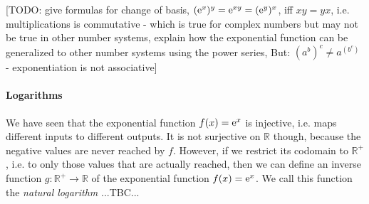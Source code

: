 [TODO: give formulas for change of basis, $(\operatorname{\mathrm{e}}^x)^y = \operatorname{\mathrm{e}}^{x y} = (\operatorname{\mathrm{e}}^y)^x$, iff $xy = yx$, i.e. multiplications is commutative - which is true for complex numbers but may not be true in other number systems, explain how the exponential function can be generalized to other number systems using the power series, But: $(a^b)^c \neq a^{(b^c)}$ - exponentiation is not associative]











\paragraph{Logarithms}
We have seen that the exponential function $f(x) = \operatorname{\mathrm{e}}^x$ is injective, i.e. maps different inputs to different outputs. It is not surjective on $\mathbb{R}$ though, because the negative values are never reached by $f$. However, if we restrict its codomain to $\mathbb{R}^+$, i.e. to only those values that are actually reached, then we can define an inverse function $g: \mathbb{R}^+ \rightarrow \mathbb{R}$ of the exponential function $f(x) = \operatorname{\mathrm{e}}^x$. We call this function the \emph{natural logarithm} ...TBC...

